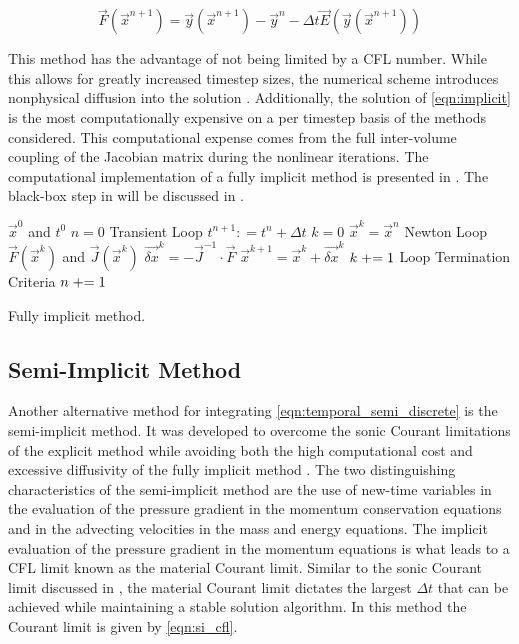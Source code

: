 \begin{equation}
\label{eqn:implicit}
\vec{F}(\vec{x}^{n+1}) = \vec{y}(\vec{x}^{n+1}) - \vec{y}^{n} - \Delta t \vec{E}(\vec{y}(\vec{x}^{n+1}))
\end{equation}

This method has the advantage of not being limited by a CFL number.
While this allows for greatly increased timestep sizes, the numerical scheme introduces nonphysical diffusion into the solution \cite{Mahaffy1993}.
Additionally, the solution of \eqref{eqn:implicit} is the most computationally expensive on a per timestep basis of the methods considered.
This computational expense comes from the full inter-volume coupling of the Jacobian matrix during the nonlinear iterations.
The computational implementation of a fully implicit method is presented in .
The black-box step in  will be discussed in .

\begin{algo}[ht!]
\setlength{\baselineskip}{0.625\baselineskip}
\begin{algorithmic}[1]
\Require $\vec{x}^{0}$ and $t^{0}$
\Set $n = 0$
\Loop \; Transient Loop
    \Set $t^{n+1} : = t^{n} + \Delta t$
    \Set $k = 0$
    \Set $\vec{x}^{k} = \vec{x}^{n}$
    \Loop \; Newton Loop
		\Calculate $\vec{F}(\vec{x}^{k})$ and $\vec{J}(\vec{x}^{k})$
		\Calculate $\vec{\delta x}^k = - \vec{J}^{-1}\cdot\vec{F}$
		\Calculate $\vec{x}^{k+1} = \vec{x}^{k} + \vec{\delta x}^{k}$
		\Set $k \mathrel{+}= 1$
		\BlackBox Loop Termination Criteria
	\EndLoop	
	\Set $n \mathrel{+}= 1$
\EndLoop
\end{algorithmic}
\caption{Fully implicit method.}
\label{algo:implicit}
\end{algo}

\subsection{Semi-Implicit Method}
\label{subsect:semi_implicit}

Another alternative method for integrating \eqref{eqn:temporal_semi_discrete} is the semi-implicit method.
It was developed to overcome the sonic Courant limitations of the explicit method while avoiding both the high computational cost and excessive diffusivity of the fully implicit method \cite{Liles1978}.
The two distinguishing characteristics of the semi-implicit method are the use of new-time variables in the evaluation of the pressure gradient in the momentum conservation equations and in the advecting velocities in the mass and energy equations. 
The implicit evaluation of the pressure gradient in the momentum equations is what leads to a CFL limit known as the material Courant limit.
Similar to the sonic Courant limit discussed in , the material Courant limit dictates the largest $\Delta t$ that can be achieved while maintaining a stable solution algorithm.
In this method the Courant limit is given by \eqref{eqn:si_cfl}.

